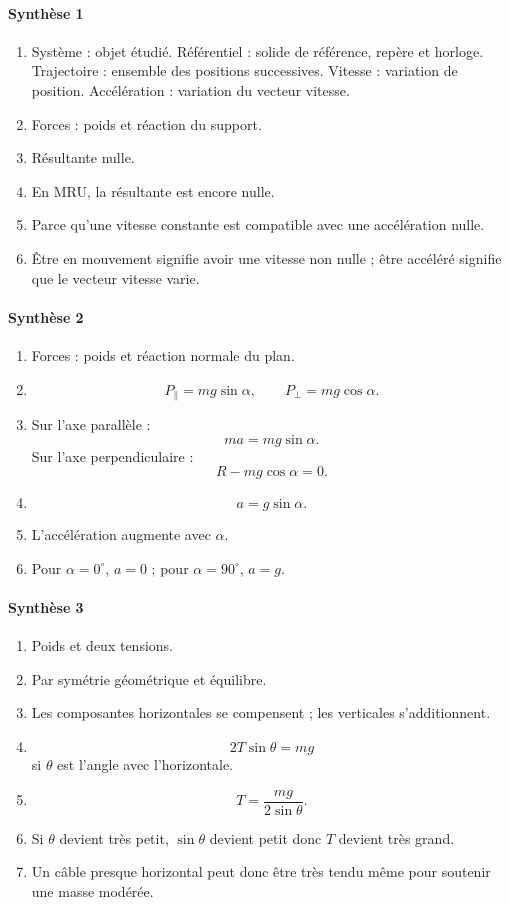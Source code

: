 \documentclass[11pt,a4paper]{article}
\theoremstyle{definition}
\begin{document}
\paragraph{Synthèse 1}
\begin{enumerate}[label=\arabic*.]
    \item Système : objet étudié. Référentiel : solide de référence, repère et horloge.
    Trajectoire : ensemble des positions successives. Vitesse : variation de position.
    Accélération : variation du vecteur vitesse.
    \item Forces : poids et réaction du support.
    \item Résultante nulle.
    \item En MRU, la résultante est encore nulle.
    \item Parce qu’une vitesse constante est compatible avec une accélération nulle.
    \item Être en mouvement signifie avoir une vitesse non nulle ; être accéléré signifie que le vecteur vitesse varie.
\end{enumerate}

\paragraph{Synthèse 2}
\begin{enumerate}[label=\arabic*.]
    \item Forces : poids et réaction normale du plan.
    \item
    \[
    P_\parallel=mg\sin\alpha,\qquad P_\perp=mg\cos\alpha.
    \]
    \item Sur l’axe parallèle :
    \[
    ma=mg\sin\alpha.
    \]
    Sur l’axe perpendiculaire :
    \[
    R-mg\cos\alpha=0.
    \]
    \item
    \[
    a=g\sin\alpha.
    \]
    \item L’accélération augmente avec $\alpha$.
    \item Pour $\alpha=0^\circ$, $a=0$ ; pour $\alpha=90^\circ$, $a=g$.
\end{enumerate}

\paragraph{Synthèse 3}
\begin{enumerate}[label=\arabic*.]
    \item Poids et deux tensions.
    \item Par symétrie géométrique et équilibre.
    \item Les composantes horizontales se compensent ; les verticales s’additionnent.
    \item
    \[
    2T\sin\theta=mg
    \]
    si $\theta$ est l’angle avec l’horizontale.
    \item
    \[
    T=\frac{mg}{2\sin\theta}.
    \]
    \item Si $\theta$ devient très petit, $\sin\theta$ devient petit donc $T$ devient très grand.
    \item Un câble presque horizontal peut donc être très tendu même pour soutenir une masse modérée.
\end{enumerate}
\end{document}

